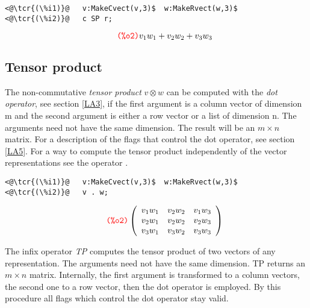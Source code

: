 \documentclass[../Maxima_Workbook.tex]{subfiles}
\begin{document}
\lz \begin{small}
\color{blue}
\begin{lstlisting}
<@\tcr{(\%i1)}@   v:MakeCvect(v,3)$  w:MakeRvect(w,3)$
<@\tcr{(\%i2)}@   c SP r;
\end{lstlisting}
\vspace{-5.5mm} \[\tag*{\tcr{\ttfamily (\%o2)}} v_1w_1 + v_2w_2 + v_3w_3 \]
\color{black}
\end{small}

\vspace{-6mm} \subsection{Tensor product}\label{LA2}

The non-commutative \emph{tensor product} $ v \otimes w $ can be computed with the \emph{dot operator}, see section \ref{LA3}, if the first argument is a column vector of dimension m and the second argument is either a row vector or a list of dimension n. The arguments need not have the same dimension. The result will be an $ m \times n $ matrix. For a description of the flags that control the dot operator, see section \ref{LA5}. For a way to compute the tensor product independently of the vector representations see the operator .

\lz \begin{small}
\color{blue}
\begin{lstlisting}
<@\tcr{(\%i1)}@   v:MakeCvect(v,3)$  w:MakeRvect(w,3)$
<@\tcr{(\%i2)}@   v . w;
\end{lstlisting}
\vspace{-6mm} \[\tag*{\tcr{\ttfamily (\%o2)}} \left( \begin{array} {ccc} v_1w_1 & v_2w_2 & v_1w_3 \\ v_2w_1 & v_2w_2 & v_2w_3 \\ v_3w_1 & v_3w_2 & v_3w_3 \end{array} \right) \]
\color{black}
\end{small}

\vspace{-4mm} \lzz {} \hfill {}

\lz The infix operator \emph{TP} computes the tensor product of two vectors of any representation. The arguments need not have the same dimension. TP returns an $ m \times n $ matrix. Internally, the first argument is transformed to a column vectors, the second one to a row vector, then the dot operator is employed. By this procedure all flags which control the dot operator stay valid.
\end{document}
